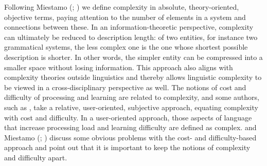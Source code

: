 \documentclass[output=collectionpaper]{langsci/langscibook}
\begin{document}
Following Miestamo (\citealt*{Miestamo2006}; \citealt*{Miestamo2008}) we define complexity in absolute, theory-oriented, objective terms, paying attention to the number of elements in a system and connections between these.
In an information-theoretic perspective, complexity can ultimately be reduced to description length: of two entities, for instance two grammatical systems, the less complex one is the one whose shortest possible description is shorter. In other words, the simpler entity can be compressed into a smaller space without losing information. This approach also aligns with complexity theories outside linguistics and thereby allows linguistic complexity to be viewed in a cross-disciplinary perspective as well.
The notions of cost and difficulty of processing and learning are related to complexity, and some authors, such as \citet{Kusters2003}, take a relative, user-oriented, subjective approach, equating complexity with cost and difficulty. In a user-oriented approach, those aspects of language that increase processing load and learning difficulty are defined as complex. \citet{Dahl2004} and Miestamo (\citealt*{Miestamo2006}; \citealt*{Miestamo2008}) discuss some obvious problems with the cost- and difficulty-based approach and point out that it is important to keep the notions of complexity and difficulty apart.
\end{document}
